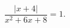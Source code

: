 \begin{ex}[type=equation]
	\begin{condition}
		$\dfrac{\big|x + 4\big|}{x^2 + 6x + 8}= 1.$
	\end{condition}
\end{ex}